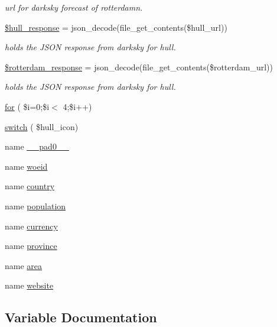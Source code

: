 \begin{DoxyCompactItemize}
\begin{DoxyCompactList}\small\item\em url for darksky forecast of rotterdamn. \end{DoxyCompactList}\item 
\mbox{\hyperlink{index_8php_a1c4e9907a22b4c6da1c5a7837a4d539e}{\$hull\+\_\+response}} = json\+\_\+decode(file\+\_\+get\+\_\+contents(\$hull\+\_\+url))
\begin{DoxyCompactList}\small\item\em holds the J\+S\+ON response from darksky for hull. \end{DoxyCompactList}\item 
\mbox{\hyperlink{index_8php_a3257c196b67efb81ddcc803e2cac7ed2}{\$rotterdam\+\_\+response}} = json\+\_\+decode(file\+\_\+get\+\_\+contents(\$rotterdam\+\_\+url))
\begin{DoxyCompactList}\small\item\em holds the J\+S\+ON response from darksky for hull. \end{DoxyCompactList}\item 
\mbox{\hyperlink{index_8php_aa11bce3c9d33806cade344b0536e0508}{for}} ( \$i=0;\$i$<$ 4;\$i++)
\item 
\mbox{\hyperlink{index_8php_ad2faa0eadeef0c97994ef3b2d91b08ea}{switch}} ( \$hull\+\_\+icon)
\item 
name \mbox{\hyperlink{index_8php_a36342860613418f919ffbf3aa4246442}{\+\_\+\+\_\+pad0\+\_\+\+\_\+}}
\item 
name \mbox{\hyperlink{index_8php_a351cdce8b3559e1c850fe0223c244ef7}{woeid}}
\item 
name \mbox{\hyperlink{index_8php_a0f0752705301c982dc8994ebc993e6e9}{country}}
\item 
name \mbox{\hyperlink{index_8php_aa78fa356925cd3f67d485c4d6846202b}{population}}
\item 
name \mbox{\hyperlink{index_8php_abd84e0698c321abdbf211d5b8425d0b5}{currency}}
\item 
name \mbox{\hyperlink{index_8php_a38d70414c65575df5643ad4296c9db2e}{province}}
\item 
name \mbox{\hyperlink{index_8php_a5198216176428aa2303311f956213f33}{area}}
\item 
name \mbox{\hyperlink{index_8php_a8c56014cff17c1ced653aa98455da680}{website}}
\end{DoxyCompactItemize}


\subsection{Variable Documentation}
\mbox{\label{index_8php_a1fa3127fc82f96b1436d871ef02be319}} 
